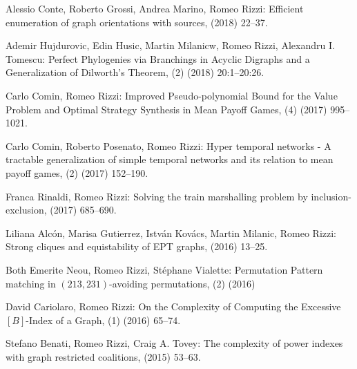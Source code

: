 \begin{etaremune}
  \item {\sc Alessio Conte, Roberto Grossi, Andrea Marino, Romeo Rizzi:}
   \newblock Efficient enumeration of graph orientations with sources,
    (2018) 22--37.

  \item {\sc Ademir Hujdurovic, Edin Husic, Martin Milanicw, Romeo Rizzi, Alexandru I. Tomescu:}
   \newblock Perfect Phylogenies via Branchings in Acyclic Digraphs and a Generalization of Dilworth's Theorem,
   (2) (2018) 20:1--20:26.

  \item {\sc Carlo Comin, Romeo Rizzi:}
   \newblock Improved Pseudo-polynomial Bound for the Value Problem and Optimal Strategy Synthesis in Mean Payoff Games,
   (4) (2017) 995--1021.

  \item {\sc Carlo Comin, Roberto Posenato, Romeo Rizzi:}
   \newblock Hyper temporal networks - A tractable generalization of simple temporal networks and its relation to mean payoff games,
   (2) (2017) 152--190.

  \item {\sc Franca Rinaldi, Romeo Rizzi:}
   \newblock Solving the train marshalling problem by inclusion-exclusion,
    (2017) 685--690.

  \item {\sc Liliana Alcón, Marisa Gutierrez, István Kovács, Martin Milanic, Romeo Rizzi:}
   \newblock Strong cliques and equistability of EPT graphs,
    (2016) 13--25.

  \item {\sc Both Emerite Neou, Romeo Rizzi, Stéphane Vialette:}
   \newblock Permutation Pattern matching in $(213, 231)$-avoiding permutations,
   (2) (2016)
   
  \item {\sc David Cariolaro, Romeo Rizzi:}
   \newblock On the Complexity of Computing the Excessive $[B]$-Index of a Graph,
   (1) (2016) 65--74.

  \item {\sc Stefano Benati, Romeo Rizzi, Craig A. Tovey:}
   \newblock The complexity of power indexes with graph restricted coalitions,
    (2015) 53--63.


\end{etaremune}
